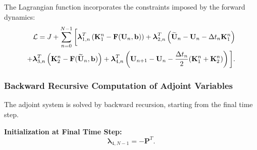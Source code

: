 The Lagrangian function incorporates the constraints imposed by the forward dynamics:
\begin{align}
\mathcal{L} = J + \sum_{n=0}^{N-1} \bigg[
\boldsymbol{\lambda}_{1,n}^T \left( \mathbf{K}_1^n - \mathbf{F}(\mathbf{U}_n, \mathbf{b}) \right)
+ \boldsymbol{\lambda}_{2,n}^T \left( \widetilde{\mathbf{U}}_n - \mathbf{U}_n - \Delta t_n \mathbf{K}_1^n \right)  \notag \\
+ \boldsymbol{\lambda}_{3,n}^T \left( \mathbf{K}_2^n - \mathbf{F}(\widetilde{\mathbf{U}}_n, \mathbf{b}) \right)
+ \boldsymbol{\lambda}_{4,n}^T \left( \mathbf{U}_{n+1} - \mathbf{U}_n - \frac{\Delta t_n}{2} (\mathbf{K}_1^n + \mathbf{K}_2^n) \right) \bigg].
\end{align}

\subsubsection*{Backward Recursive Computation of Adjoint Variables}

The adjoint system is solved by backward recursion, starting from the final time step.

\textbf{Initialization at Final Time Step:}
\begin{equation}
\boldsymbol{\lambda}_{4,N-1} = -\mathbf{P}^T.
\end{equation}

